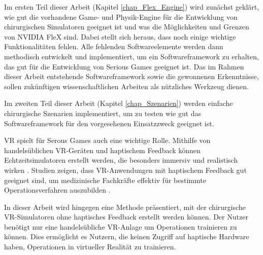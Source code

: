 Im ersten Teil dieser Arbeit (Kapitel \ref{chap_Flex_Engine}) wird zunächst geklärt, wie gut die vorhandene Game- und Physik-Engine für die Entwicklung von chirurgischen Simulatoren geeignet ist und was die Möglichkeiten und Grenzen von NVIDIA FleX sind. Dabei stellt sich heraus, dass noch einige wichtige Funktionalitäten fehlen. Alle fehlenden Softwareelemente werden dann methodisch entwickelt und implementiert, um ein Softwareframework zu erhalten, das gut für die Entwicklung von Serious Games geeignet ist. Das im Rahmen dieser Arbeit entstehende Softwareframework sowie die gewonnenen Erkenntnisse, sollen zukünftigen wissenschaftlichen Arbeiten als nützliches Werkzeug dienen.

Im zweiten Teil dieser Arbeit (Kapitel \ref{chap_Szenarien}) werden einfache chirurgische Szenarien implementiert, um zu testen wie gut das Softwareframework für den vorgesehenen Einsatzzweck geeignet ist. 

\ac{VR} spielt für Serous Games auch eine wichtige Rolle. 
Mithilfe von handelsüblichen VR-Geräten und haptischem Feedback können Echtzeitsimulatoren erstellt werden, die besonders immersiv und realistisch wirken \cite{VRSim20}. 
Studien zeigen, dass VR-Anwendungen mit haptischem Feedback gut geeignet sind, um medizinische Fachkräfte effektiv für bestimmte Operationsverfahren auszubilden  \cite{VRHapticSim}.

In dieser Arbeit wird hingegen eine Methode präsentiert, mit der chirurgische VR-Simulatoren ohne haptisches Feedback erstellt werden können. Der Nutzer benötigt nur eine handelsübliche VR-Anlage 
um Operationen trainieren zu können. 
Dies ermöglicht es Nutzern, die keinen Zugriff auf haptische Hardware haben, Operationen in virtueller Realität zu trainieren. 


